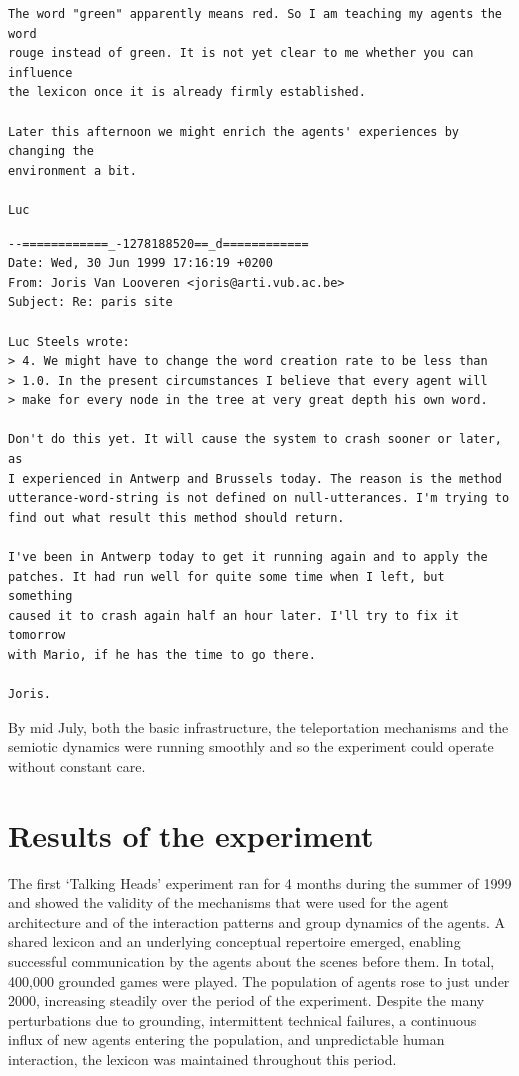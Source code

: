 {{\begin{verbatim}
The word "green" apparently means red. So I am teaching my agents the word
rouge instead of green. It is not yet clear to me whether you can influence 
the lexicon once it is already firmly established.

Later this afternoon we might enrich the agents' experiences by changing the
environment a bit.

Luc
\end{verbatim}
\begin{verbatim}
--============_-1278188520==_d============
Date: Wed, 30 Jun 1999 17:16:19 +0200
From: Joris Van Looveren <joris@arti.vub.ac.be>
Subject: Re: paris site

Luc Steels wrote:
> 4. We might have to change the word creation rate to be less than 
> 1.0. In the present circumstances I believe that every agent will 
> make for every node in the tree at very great depth his own word.

Don't do this yet. It will cause the system to crash sooner or later, as
I experienced in Antwerp and Brussels today. The reason is the method
utterance-word-string is not defined on null-utterances. I'm trying to
find out what result this method should return.

I've been in Antwerp today to get it running again and to apply the
patches. It had run well for quite some time when I left, but something
caused it to crash again half an hour later. I'll try to fix it tomorrow
with Mario, if he has the time to go there.

Joris.
\end{verbatim}}
\normalsize
By mid July, both the basic infrastructure, the teleportation mechanisms and the semiotic dynamics were running 
smoothly and so the experiment could operate without constant care. 

\section{Results of the experiment}

The first `Talking Heads' experiment ran for 4 months during the summer of 1999 and showed the validity of the mechanisms that were used for the agent architecture and of the interaction patterns and group dynamics of the agents. A shared lexicon and an underlying conceptual repertoire emerged, enabling successful communication by the agents about the scenes before them. In total, 400,000 grounded games were played. The population of agents rose to just under 2000, increasing steadily over the period of the experiment. Despite the many perturbations due to grounding, intermittent technical failures, a continuous influx of new agents entering the population, and unpredictable human interaction, the lexicon was maintained throughout this period.

}
